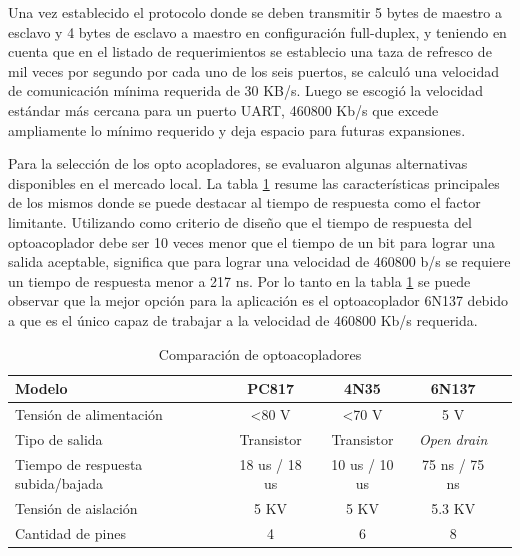 Una vez establecido el protocolo donde se deben transmitir 5 bytes de maestro a esclavo y 4 bytes de esclavo a maestro en configuración full-duplex, y teniendo en cuenta que en el listado de requerimientos se establecio una taza de refresco de mil veces por segundo por cada uno de los seis puertos, se calculó una velocidad de comunicación mínima requerida de 30 KB/s. Luego se escogió la velocidad estándar más cercana para un puerto UART, 460800 Kb/s que excede ampliamente lo mínimo requerido y deja espacio para futuras expansiones.

Para la selección de los opto acopladores, se evaluaron algunas alternativas disponibles en el mercado local. La tabla \ref{tab:Optos} resume las características principales de los mismos donde se puede destacar al tiempo de respuesta como el factor limitante. 
Utilizando como criterio de diseño que el tiempo de respuesta del optoacoplador debe ser 10 veces menor que el tiempo de un bit para lograr una salida aceptable, significa que para lograr una velocidad de 460800 b/s se requiere un tiempo de respuesta menor a 217 ns. Por lo tanto en la tabla \ref{tab:Optos} se puede observar que la mejor opción para la aplicación es el optoacoplador 6N137 debido a que es el único capaz de trabajar a la velocidad de 460800 Kb/s requerida.

	\begin{table}[h]
	\centering
	\caption[Tabla de comparación de optoacopladores para la interfaz UART optoaislada]{Comparación de optoacopladores}
	\begin{tabular}{l c c c c}    
		\toprule
		\textbf{Modelo} 	 & \textbf{PC817\citep{PC817}} & \textbf{4N35\citep{4N35}}& \textbf{6N137\citep{6N137}}	\\
		\midrule
Tensión de alimentación             & \textless{}80 V & \textless{}70 V & 5 V           &  \\
Tipo de salida                      & Transistor      & Transistor      & \emph{Open drain}    &  \\
Tiempo de respuesta subida/bajada & 18 us / 18 us   & 10 us / 10 us   & 75 ns / 75 ns &  \\
Tensión de aislación                & 5 KV            & 5 KV            & 5.3 KV        &  \\
Cantidad de pines                   & 4               & 6               & 8             & \\
		\bottomrule
		\hline
	\end{tabular}
	\label{tab:Optos}
\end{table}

